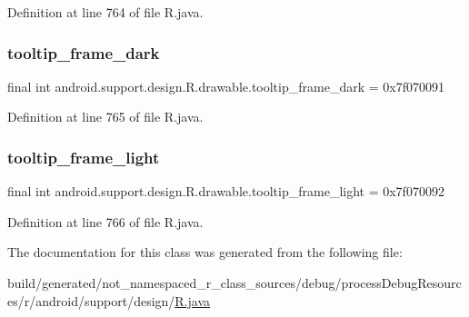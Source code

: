 Definition at line 764 of file R.\+java.

\mbox{\label{classandroid_1_1support_1_1design_1_1_r_1_1drawable_ad541536a37b940afd49330600c8e6fb1}} 
\subsubsection{\texorpdfstring{tooltip\_frame\_dark}{tooltip\_frame\_dark}}
{\footnotesize\ttfamily final int android.\+support.\+design.\+R.\+drawable.\+tooltip\+\_\+frame\+\_\+dark = 0x7f070091\hspace{0.3cm}{\ttfamily [static]}}



Definition at line 765 of file R.\+java.

\mbox{\label{classandroid_1_1support_1_1design_1_1_r_1_1drawable_aafa93bfc1b95635189723fd95253b79c}} 
\subsubsection{\texorpdfstring{tooltip\_frame\_light}{tooltip\_frame\_light}}
{\footnotesize\ttfamily final int android.\+support.\+design.\+R.\+drawable.\+tooltip\+\_\+frame\+\_\+light = 0x7f070092\hspace{0.3cm}{\ttfamily [static]}}



Definition at line 766 of file R.\+java.



The documentation for this class was generated from the following file\+:\begin{DoxyCompactItemize}
\item 
build/generated/not\+\_\+namespaced\+\_\+r\+\_\+class\+\_\+sources/debug/process\+Debug\+Resources/r/android/support/design/\mbox{\hyperlink{android_2support_2design_2_r_8java}{R.\+java}}\end{DoxyCompactItemize}
